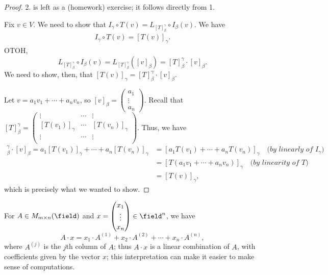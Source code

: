 \begin{proof}
    2. is left as a (homework) exercise; it follows directly from 1.

    Fix $v \in V$. We need to show that $I_\gamma \circ T(v) = L_{[T]_\beta^\gamma} \circ I_\beta(v)$. We have \begin{align*}
        I_\gamma \circ T(v) = [T(v)]_\gamma.
    \end{align*}
    OTOH, \[
    L_{[T]_\beta^\gamma} \circ I_\beta (v) = L_{[T]_\beta^\gamma} ([v]_\beta) = [T]_\beta^\gamma \cdot [v]_\beta.
    \]
    We need to show, then, that $[T(v)]_\gamma = [T]_\beta^\gamma \cdot [v]_\beta$.

    Let $v = a_1 v_1 + \cdots + a_n v_n$, so $[v]_\beta = \begin{pmatrix}
        a_1\\
        \vdots\\
        a_n
    \end{pmatrix}$. Recall that $[T]_\beta^\gamma = \begin{pmatrix}
        \vdots & \cdots & \vdots\\
        [T(v_1)]_\gamma & \cdots & [T(v_n)]_\gamma\\
        \vdots & \cdots & \vdots\\
    \end{pmatrix}$. Thus, we have \begin{align*}
        [T]_\beta^\gamma \cdot [v]_\beta = a_1 [T(v_1)]_\gamma + \cdots + a_n [T(v_n)]_\gamma &= [a_1T(v_1) + \cdots + a_n T(v_n)]_\gamma \quad \textit{(by linearly of } I_\gamma\textit{)}\\
        &= [T(a_1 v_1 + \cdots + a_n v_n)]_\gamma \quad \textit{(by linearity of }T\textit{)}\\
        &= [T(v)]_\gamma,
    \end{align*}
    which is precisely what we wanted to show.
\end{proof}

\begin{remark}
    For $A \in M_{m \times n}(\field)$ and $x = \begin{pmatrix}
        x_1\\
        \vdots\\
        x_n
    \end{pmatrix} \in \field^n$, we have \[
    A \cdot x = x_1 \cdot A^{(1)} + x_2 \cdot A^{(2)} + \cdots + x_n \cdot A^{(n)},    
    \]
    where $A^{(j)}$ is the $j$th column of $A$; thus $A \cdot x$ is a linear combination of $A$, with coefficients given by the vector $x$; this interpretation can make it easier to make sense of computations.
\end{remark}